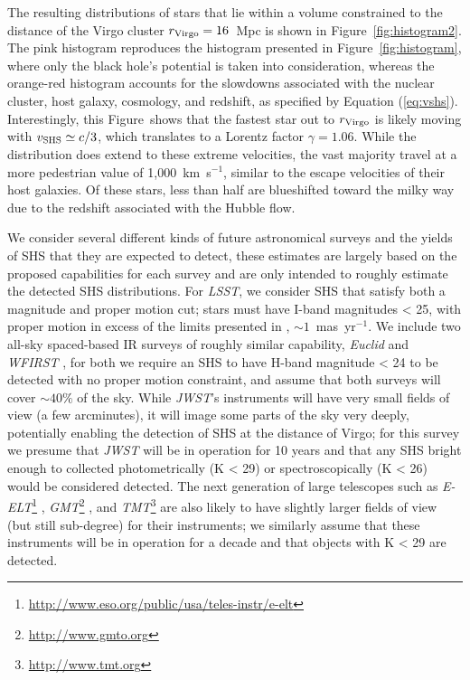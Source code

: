 \documentclass[a4paper,twocolumn]{emulateapj}
\begin{document}
{The resulting distributions of stars that lie within a volume constrained to the distance of the Virgo cluster $r_{\rm Virgo} = 16$~Mpc is shown in Figure~\ref{fig:histogram2}. The pink histogram reproduces the histogram presented in Figure~\ref{fig:histogram}, where only the black hole's potential is taken into consideration, whereas the orange-red histogram accounts for the slowdowns associated with the nuclear cluster, host galaxy, cosmology, and redshift, as specified by Equation (\ref{eq:vshs}). Interestingly, this Figure~shows that the fastest star out to $r_{\rm Virgo}$ is likely moving with $v_{\rm SHS} \simeq c/3$, which translates to a Lorentz factor $\gamma = 1.06$. While the distribution does extend to these extreme velocities, the vast majority travel at a more pedestrian value of 1,000~km~s$^{-1}$, similar to the escape velocities of their host galaxies. Of these stars, less than half are blueshifted toward the milky way due to the redshift associated with the Hubble flow.

We consider several different kinds of future astronomical surveys and the yields of SHS that they are expected to detect, these estimates are largely based on the proposed capabilities for each survey and are only intended to roughly estimate the detected SHS distributions. For {\it LSST}, we consider SHS that satisfy both a magnitude and proper motion cut; stars must have I-band magnitudes < 25, with proper motion in excess of the limits presented in \citet{Ivezic:2008a}, $\sim 1$~mas~yr$^{-1}$. We include two all-sky spaced-based IR surveys of roughly similar capability, {\it Euclid} \citep{Laureijs:2011a} and {\it WFIRST} \citep{Green:2012a}, for both we require  an SHS to have H-band magnitude < 24 to be detected with no proper motion constraint, and assume that both surveys will cover $\sim 40\%$ of the sky. While {\it JWST}'s instruments will have very small fields of view (a few arcminutes), it will image some parts of the sky very deeply, potentially enabling the detection of SHS at the distance of Virgo; for this survey we presume that {\it JWST} will be in operation for 10 years and that any SHS bright enough to collected photometrically (K < 29) or spectroscopically (K < 26) would be considered detected. The next generation of large telescopes such as {\it E-ELT}\footnote{\url{http://www.eso.org/public/usa/teles-instr/e-elt}} \citep{Gilmozzi:2007a}, {\it GMT}\footnote{\url{http://www.gmto.org}} \citep{Johns:2012a}, and {\it TMT}\footnote{\url{http://www.tmt.org}} \citep{Macintosh:2006a} are also likely to have slightly larger fields of view (but still sub-degree) for their instruments; we similarly assume that these instruments will be in operation for a decade and that objects with K < 29 are detected.

}
\end{document}
